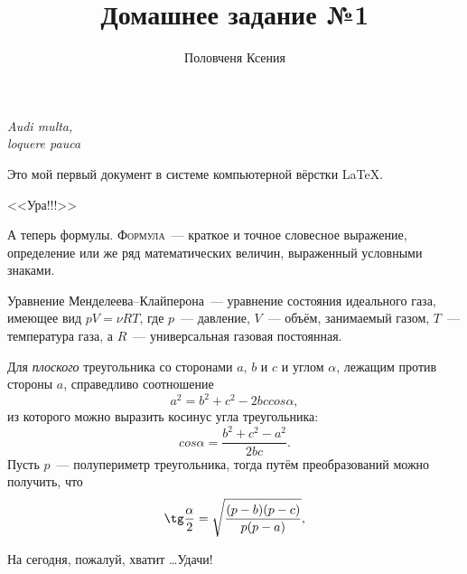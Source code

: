 \documentclass[12pt]{article}
\title{Домашнее задание №1}
\author{Половченя Ксения}
\date{}
\begin{document}
	\maketitle
	\begin{flushright}
		{\itshape Audi multa,\\ loquere pauca}
	\end{flushright}
	\vspace{20pt}
	Это мой первый документ в системе компьютерной вёрстки \LaTeX.
	
	\begin{center}
		{\LARGE \sffamily <<Ура!!!>>}
	\end{center}
	\vspace{15pt}
	
	А теперь формулы. {\scshape Формула}~--- краткое и точное словесное выражение, определение или же ряд математических величин, выраженный условными знаками.
	\vspace{15pt}
	
	\hspace{28pt}{\Large \bfseries Термодинамика}
	
	Уравнение Менделеева--Клайперона~--- уравнение состояния идеального газа, имеющее вид $pV = \nu RT$, где $p$~--- давление,  $V$~--- объём, занимаемый газом, $T$~--- температура газа, а $R$~--- универсальная газовая постоянная.
	\vspace{15pt}
	
	\hspace{28pt}{\Large \bfseries Геометрия \hfill Планиметрия}
	
	Для {\slshape плоского} треугольника со сторонами $a$, $b$ и $c$ и углом $\alpha$, лежащим против стороны $a$, справедливо соотношение $$a^2 = b^2 + c^2 - 2bccos\alpha,$$ из которого можно выразить косинус угла треугольника: $$cos\alpha = \frac{b^2+c^2-a^2}{2bc}.$$
	Пусть $p$~--- полупериметр треугольника, тогда путём преобразований можно получить, что $$\tg\frac{\alpha}{2} = \sqrt{\frac{(p - b)(p - c)}{p(p - a)}},$$
	
	\vspace{1cm}
	\begin{flushleft}
		На сегодня, пожалуй, хватит \ldots Удачи!
	\end{flushleft}
	
\end{document}
